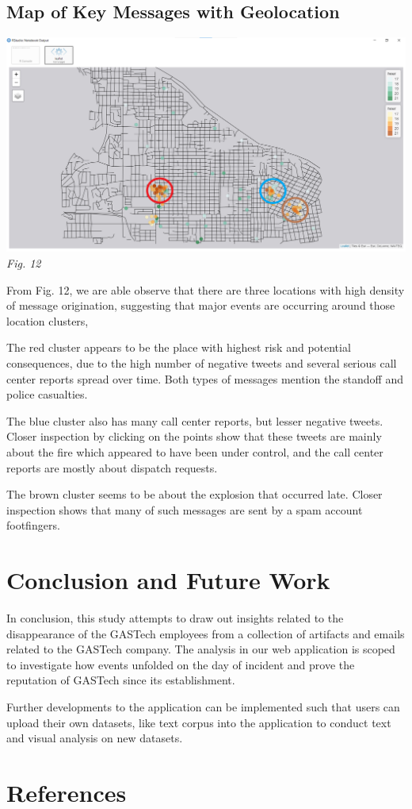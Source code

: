 \documentclass{acm_proc_article-sp}
\begin{document}
\hypertarget{map-of-key-messages-with-geolocation}{%
\subsection{Map of Key Messages with
Geolocation}\label{map-of-key-messages-with-geolocation}}

\includegraphics{img/image11.png} \emph{Fig. 12}

From Fig. 12, we are able observe that there are three locations with
high density of message origination, suggesting that major events are
occurring around those location clusters,

The red cluster appears to be the place with highest risk and potential
consequences, due to the high number of negative tweets and several
serious call center reports spread over time. Both types of messages
mention the standoff and police casualties.

The blue cluster also has many call center reports, but lesser negative
tweets. Closer inspection by clicking on the points show that these
tweets are mainly about the fire which appeared to have been under
control, and the call center reports are mostly about dispatch requests.

The brown cluster seems to be about the explosion that occurred late.
Closer inspection shows that many of such messages are sent by a spam
account footfingers.

\hypertarget{conclusion-and-future-work}{%
\section{Conclusion and Future Work}\label{conclusion-and-future-work}}

In conclusion, this study attempts to draw out insights related to the
disappearance of the GASTech employees from a collection of artifacts
and emails related to the GASTech company. The analysis in our web
application is scoped to investigate how events unfolded on the day of
incident and prove the reputation of GASTech since its establishment.

Further developments to the application can be implemented such that
users can upload their own datasets, like text corpus into the
application to conduct text and visual analysis on new datasets.

\hypertarget{references}{%
\section{References}\label{references}}
\setlength{\parindent}{0in}
\end{document}

